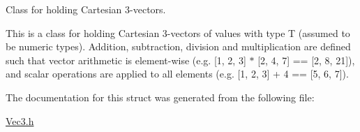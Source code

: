 Class for holding Cartesian 3-\/vectors. 

This is a class for holding Cartesian 3-\/vectors of values with type T (assumed to be numeric types). Addition, subtraction, division and multiplication are defined such that vector arithmetic is element-\/wise (e.\+g. {\ttfamily \mbox{[}1, 2, 3\mbox{]} $\ast$ \mbox{[}2, 4, 7\mbox{]} == \mbox{[}2, 8, 21\mbox{]}}), and scalar operations are applied to all elements (e.\+g. {\ttfamily \mbox{[}1, 2, 3\mbox{]} + 4 == \mbox{[}5, 6, 7\mbox{]}}). 

The documentation for this struct was generated from the following file\+:\begin{DoxyCompactItemize}
\item 
\hyperlink{_vec3_8h}{Vec3.\+h}\end{DoxyCompactItemize}
